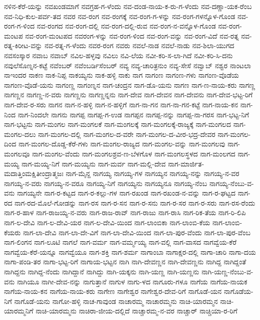 ನಳಿನ-ಕೆರೆ-ಯನ್ನು
ನವಖಂಡಮಾಗೆ
ನವಗ್ರಹ-ಗ-ಳೆಂದು
ನವ-ದಂಡ-ನಾಯ-ಕ-ರು-ಗ-ಳೆಂದು
ನವ-ದಣ್ಣಾ-ಯಕ-ರೆಂಬ
ನವ-ನಿಧಿ-ಕುಲ-ಪರ್ವ-ತದ
ನವರ
ನವ-ರಂಗ
ನವ-ರಂಗಕ್ಕೆ
ನವ-ರಂಗ-ಗ-ಳನ್ನು
ನವ-ರಂಗ-ಗಳನ್ನೊಳ-ಗೊಂಡ
ನವ-ರಂಗ-ಗ-ಳಿಂದ
ನವ-ರಂಗದ
ನವ-ರಂಗ-ದಲ್ಲಿ
ನವ-ರಂಗ-ದಲ್ಲಿ-ರುವ
ನವ-ರಂಗ-ನ-ವನ್ನೊಳ-ಗೊಂಡ
ನವ-ರಂಗ-ಮಂಟಪ
ನವ-ರಂಗ-ಮಂಟಪದ
ನವರಂಗ-ಳನ್ನು
ನವ-ರಂಗ-ಳಿಂದ
ನವ-ರಂಗ-ವನ್ನು
ನವ-ರಂಗ-ವಿದೆ
ನವ-ರತ್ನ
ನವ-ರತ್ನ-ಕಿರೀಟ-ವನ್ನು
ನವ-ರತ್ನ-ಗ-ಳೆಂದು
ನವರ-ರಂಗ
ನವರು
ನವಲೆ-ನಾಡ
ನವಲೆ-ನಾಡು
ನವ-ಶಿಲಾ-ಯುಗದ
ನವಸಂಸ್ಕಾರ
ನವಾಬ
ನವಾಬ್
ನವಿಲ-ಹಳ್ಳವು
ನವಿಲು
ನವಿ-ಲೆಯ
ನವೀ-ಕರಿ-ಸ-ಲಾ-ಗಿದೆ
ನವೀ-ಕರಿ-ಸಿ-ದನು
ನವುಲೆಸೊಣ್ನನ-ಕಟ್ಟೆ
ನವೆಂಬರ್
ನವೆಂಬರ್ಡಿಸೆಂಬರ್
ನವ್ಯ
ನವ್ಯ-ಚಾರಿತ್ರನುಂ
ನವ್ಯ-ಸೇಸೆ
ನವ್ವಾಬ್
ನಶ್ವರ
ನಾಂಟಲಾ
ನಾಇಂದರ
ನಾಕಣ
ನಾಕ-ನಿಪ್ಪ
ನಾಕಯ್ಯನು
ನಾಕ-ಹಳ್ಳಿ
ನಾಕು
ನಾಗ
ನಾಗಂಣ
ನಾಗಂಣ-ಗಳು
ನಾಗಂಣ-ವೊಡೆಯ
ನಾಗಂಣ-ವೊಡೆ-ಯನು
ನಾಗಂಣ್ಣ
ನಾಗಂಣ್ನನ
ನಾಗ-ಚಂದ್ರನ
ನಾಗ-ಡೊ-ಯನು
ನಾಗಣ
ನಾಗ-ಣ-ನಾಯ-ಕರು
ನಾಗಣ್ಣ
ನಾಗಣ್ಣನ
ನಾಗಣ್ಣ-ನ-ವರು
ನಾಗಣ್ಣನು
ನಾಗಣ್ಣನ್ನನು
ನಾಗ-ದೇವ
ನಾಗ-ದೇವನ
ನಾಗ-ದೇವನು
ನಾಗ-ದೇವ-ಭಟ್ಟ-ರಿಗೆ
ನಾಗ-ದೇವ-ರ-ಸರು
ನಾಗನ
ನಾಗ-ನ-ಹಳ್ಳಿ
ನಾಗ-ನ-ಹಳ್ಳಿಗೆ
ನಾಗ-ನಾ-ಗನ
ನಾಗ-ನಾ-ಗನ-ಕಟ್ಟೆ
ನಾಗ-ನಾಯ-ಕನ
ನಾಗ-ನಿಂದ
ನಾಗ-ನಿಂದಲೇ
ನಾಗನು
ನಾಗಪ್ಪ
ನಾಗಪ್ಪ-ಗ-ಉಡ
ನಾಗಪ್ಪನ
ನಾಗಪ್ಪ-ನನ್ನು
ನಾಗಪ್ಪ-ನಾ-ಗರಸ
ನಾಗ-ಭಟ್ಟ-ನಿಗೆ
ನಾಗ-ಭಟ್ಟನು
ನಾಗ-ಮಂಗಲ
ನಾಗ-ಮಂಗಲಕೆ
ನಾಗ-ಮಂಗಲಕ್ಕೆ
ನಾಗ-ಮಂಗಲಕ್ಕೆ-ರಾಜ್ಯಕ್ಕೆ
ನಾಗ-ಮಂಗಲದ
ನಾಗ-ಮಂಗಲ-ದಲು
ನಾಗ-ಮಂಗಲ-ದಲ್ಲಿ
ನಾಗ-ಮಂಗಲ-ದ-ವರೇ
ನಾಗ-ಮಂಗಲ-ದ-ವೀರ-ಭದ್ರ-ದೇವರ
ನಾಗ-ಮಂಗಲ-ದಿಂದ
ನಾಗ-ಮಂಗಲ-ದೊಡ್ಡ-ಕೆರೆ-ಗಳು
ನಾಗ-ಮಂಗಲ-ರಾಜ್ಯದ
ನಾಗ-ಮಂಗಲ-ವನ್ನು
ನಾಗ-ಮಂಗಲವು
ನಾಗ-ಮಂಗಲವೂ
ನಾಗ-ಮಂಗಲ-ವೆಂದು
ನಾಗ-ಮಂಗಲಶ್ರವ-ಣ-ಬೆಳಗೊಳ
ನಾಗ-ಮಂಗಲಸ್ಥಳದ
ನಾಗ-ಮಂಲಗದ
ನಾಗ-ಮಯ್ಯ
ನಾಗ-ಮಯ್ಯ-ನಿಗೆ
ನಾಗ-ಮಯ್ಯನು
ನಾಗ-ಮರ್ವ
ನಾಗ-ಮಲ್ಲಿ-ದೇವ
ನಾಗ-ಮಾರ್ಜಿತ-ಮದಾತ್ತಿಂಮಕ್ಷಿತೀಂದ್ರಾತ್ಮಜಃ
ನಾಗ-ಮೈನ್ದ
ನಾಗಯ್ಯ
ನಾಗಯ್ಯ-ಗಳ
ನಾಗಯ್ಯನ
ನಾಗಯ್ಯ-ನನ್ನು
ನಾಗಯ್ಯ-ನ-ವರ
ನಾಗಯ್ಯ-ನ-ವರು
ನಾಗಯ್ಯ-ನ-ವರೂ
ನಾಗಯ್ಯ-ನಿಗೆ
ನಾಗಯ್ಯನು
ನಾಗಯ್ಯನೂ
ನಾಗಯ್ಯ-ನೆಂಬ
ನಾಗಯ್ಯ-ನೆಂಬು-ವ-ವನು
ನಾಗಯ್ಯನೇ
ನಾಗ-ರ-ಕಟ್ಟದ
ನಾಗ-ರ-ಕಲ್ಲು-ಗಳ
ನಾಗ-ರಖಂಡ
ನಾಗ-ರಖಂಡ-ನ-ವನ್ನು
ನಾಗ-ರ-ಘಟ್ಟದ
ನಾಗ-ರದ
ನಾಗ-ರದ-ಮೊಲೆ-ಗೋಡನ್ನು
ನಾಗ-ರಸ
ನಾಗ-ರ-ಸನ
ನಾಗ-ರ-ಸನು
ನಾಗ-ರ-ಸರ
ನಾಗ-ರ-ಸರು
ನಾಗ-ರಸ-ರೆಂದು
ನಾಗ-ರ-ಹಾಳ
ನಾಗ-ರಾಜಯ್ಯ-ನ-ವರು
ನಾಗ-ರಾಜ-ರಾವ್
ನಾಗ-ರಾಜು
ನಾಗ-ರಾಸಿ
ನಾಗ-ರಿಕ-ತೆಯ
ನಾಗ-ರಿ-ಲಿಪಿ
ನಾಗ-ಲ-ದೇವಿ
ನಾಗ-ಲ-ದೇವಿ-ಯರ
ನಾಗ-ಲ-ದೇವಿ-ಯಿಂದ
ನಾಗ-ಲಾಂಬಿಕಾ
ನಾಗ-ಲಾಂಬಿ-ಕೆಯ
ನಾಗ-ಲಾಂಬಿ-ಕೆಯರು
ನಾಗ-ಲಾ-ದೇವಿ
ನಾಗ-ಲಾ-ದೇ-ವಿಗೆ
ನಾಗ-ಲಾ-ದೇವಿ-ಯಿಂದ
ನಾಗ-ಲಾ-ಪುರ-ವೆಂದು
ನಾಗ-ಲಾ-ಪುರ-ವೆಂಬ
ನಾಗ-ಲಿಂಗನ
ನಾಗ-ಲೂಟಿ
ನಾಗಲೆ
ನಾಗ-ವರ್ಮ
ನಾಗ-ವರ್ಮ್ಮಯ್ಯ
ನಾಗ-ವಲ್ಲಿ
ನಾಗ-ವಾಸದ
ನಾಗವ್ವೆಯ-ಕೆರೆ
ನಾಗವ್ವೆಯ-ಕೆರೆ-ಯನ್ನೂ
ನಾಗವ್ವೆಯೂ
ನಾಗ-ಶಕ್ತಿ
ನಾಗ-ಶರ್ಮ
ನಾಗಾಂಬಾ
ನಾಗಾಕ್ಷರ-ದಲ್ಲಿ
ನಾಗಾ-ಚಾರಿ
ನಾಗಾ-ದಯ
ನಾಗಾ-ಪಂಡಿ-ತರ
ನಾಗಾ-ಭಟ್ಟ-ರಿಗೆ
ನಾಗಾಯ-ಭಟ್ಟನ
ನಾಗಿ
ನಾಗಿ-ದೇವಣ್ಣನ
ನಾಗಿ-ದೇವಣ್ಣನು
ನಾಗಿದ್ದ
ನಾಗಿದ್ದಂತೆ
ನಾಗಿದ್ದನು
ನಾಗಿದ್ದ-ನೆಂದು
ನಾಗಿದ್ದಾನೆ
ನಾಗಿದ್ದು
ನಾಗಿ-ಯಕ್ಕನು
ನಾಗಿ-ಯಣ್ಣ
ನಾಗಿ-ಯಣ್ಣನು
ನಾಗಿ-ಯಣ್ಣ-ನೆಂಬು-ವ-ವನು
ನಾಗಿಯೂ
ನಾಗೀ-ದೇವ-ನನ್ನು
ನಾಗುತ್ತಾನೆ
ನಾಗುಳ
ನಾಗು-ಳದ
ನಾಗೂರು-ಗಳೂ
ನಾಗೆಯ
ನಾಗೆಯ-ನಾಯಕ
ನಾಗೆಯ-ನಾಯ-ಕನ
ನಾಗೆಯ-ನಾಯ-ಕರು
ನಾಗೇಣ
ನಾಗೇಶ್ವರ
ನಾಗೇಶ್ವರ-ದೇವ-ರಿಗೆ
ನಾಗೊಡೆ-ಯನ
ನಾಗೊಡೆಯ-ನಿಗೆ
ನಾಗೊಡೆ-ಯನು
ನಾಗೋ-ಹಳ್ಳಿ
ನಾಚ-ಗಾವುಂಡ
ನಾಚಾರಮ್ಮ
ನಾಚಾರಮ್ಮನು
ನಾಚಿ-ಯಾರಮ್ಮನ
ನಾಚಿ-ಯಾರಮ್ಮನಿಗೆ
ನಾಚಿ-ಯಾರಮ್ಮನು
ನಾಚಿರಾ-ಜೀಯ-ದಲ್ಲಿದೆ
ನಾಚ್ಚಾರಮ್ಮ-ನ-ವರ
ನಾಚ್ಚಾರ್
ನಾಚ್ಚಿಯಾ-ರ-ರಿಗೆ
